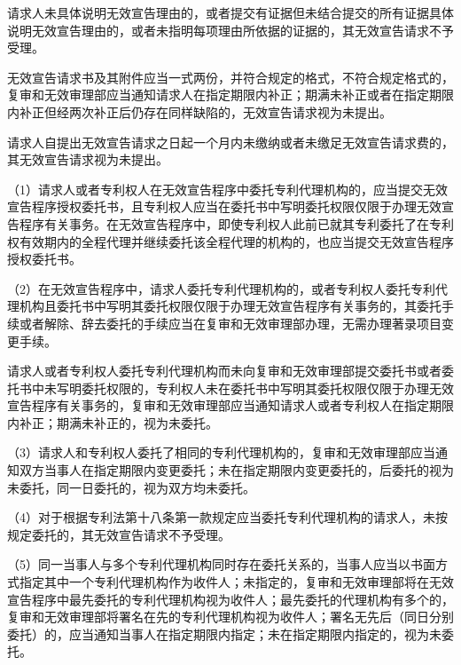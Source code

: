 请求人未具体说明无效宣告理由的，或者提交有证据但未结合提交的所有证据具体说明无效宣告理由的，或者未指明每项理由所依据的证据的，其无效宣告请求不予受理。

无效宣告请求书及其附件应当一式两份，并符合规定的格式，不符合规定格式的，复审和无效审理部应当通知请求人在指定期限内补正；期满未补正或者在指定期限内补正但经两次补正后仍存在同样缺陷的，无效宣告请求视为未提出。

请求人自提出无效宣告请求之日起一个月内未缴纳或者未缴足无效宣告请求费的，其无效宣告请求视为未提出。

{\setlength{\parindent}{17.1bp}（1）请求人或者专利权人在无效宣告程序中委托专利代理机构的，应当提交无效宣告程序授权委托书，且专利权人应当在委托书中写明委托权限仅限于办理无效宣告程序有关事务。在无效宣告程序中，即使专利权人此前已就其专利委托了在专利权有效期内的全程代理并继续委托该全程代理的机构的，也应当提交无效宣告程序授权委托书。\par}

{\setlength{\parindent}{17.1bp}（2）在无效宣告程序中，请求人委托专利代理机构的，或者专利权人委托专利代理机构且委托书中写明其委托权限仅限于办理无效宣告程序有关事务的，其委托手续或者解除、辞去委托的手续应当在复审和无效审理部办理，无需办理著录项目变更手续。\par}

请求人或者专利权人委托专利代理机构而未向复审和无效审理部提交委托书或者委托书中未写明委托权限的，专利权人未在委托书中写明其委托权限仅限于办理无效宣告程序有关事务的，复审和无效审理部应当通知请求人或者专利权人在指定期限内补正；期满未补正的，视为未委托。

{\setlength{\parindent}{17.1bp}（3）请求人和专利权人委托了相同的专利代理机构的，复审和无效审理部应当通知双方当事人在指定期限内变更委托；未在指定期限内变更委托的，后委托的视为未委托，同一日委托的，视为双方均未委托。\par}

{\setlength{\parindent}{17.1bp}（4）对于根据专利法第十八条第一款规定应当委托专利代理机构的请求人，未按规定委托的，其无效宣告请求不予受理。\par}

{\setlength{\parindent}{17.1bp}（5）同一当事人与多个专利代理机构同时存在委托关系的，当事人应当以书面方式指定其中一个专利代理机构作为收件人；未指定的，复审和无效审理部将在无效宣告程序中最先委托的专利代理机构视为收件人；最先委托的代理机构有多个的，复审和无效审理部将署名在先的专利代理机构视为收件人；署名无先后（同日分别委托）的，应当通知当事人在指定期限内指定；未在指定期限内指定的，视为未委托。\par}

